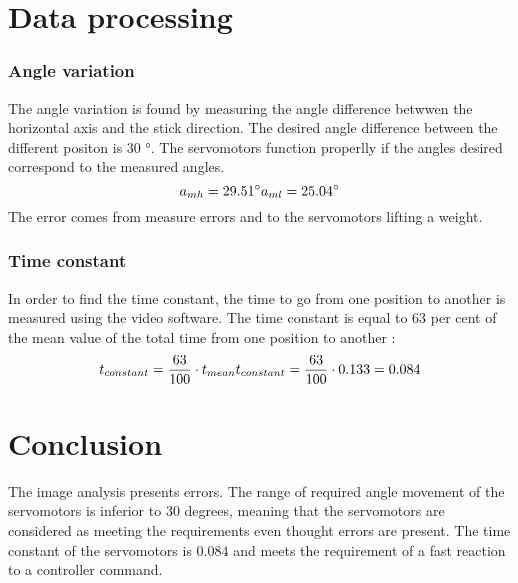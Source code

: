 	\section*{Data processing}	
	
		\subsubsection*{Angle variation}
		
The angle variation is found by measuring the angle difference betwwen the horizontal axis and the stick direction. The desired angle difference between the different positon is $30$ \si{\degree}. The servomotors function properlly if the angles desired correspond to the measured angles.
\begin{equation}
		a_{mh} = 29.51 \si{\degree} \\  
		a_{ml} = 25.04 \si{\degree}\\ 
\end{equation}
\startexplain
{}
\stopexplain
The error comes from measure errors and to the servomotors lifting a weight.

		\subsubsection*{Time constant}
		
 In order to find the time constant, the time to go from one position to another is measured using the video software. The time constant is equal to 63 per cent of the mean value of the total time from one position to another : 
 \begin{equation}
 t_{constant} = \frac{63}{100} \cdot t_{mean} \\
 t_{constant} = \frac{63}{100} \cdot 0.133 = 0.084
 \end{equation} 
 \startexplain
 \stopexplain
 
 
 

	\section*{Conclusion}
	
The image analysis presents errors. The range of required angle movement of the servomotors is inferior to $30$ degrees, meaning that the servomotors are considered as meeting the requirements even thought errors are present. The time constant of the servomotors is $0.084$ and meets the requirement of a fast reaction to a controller command.





